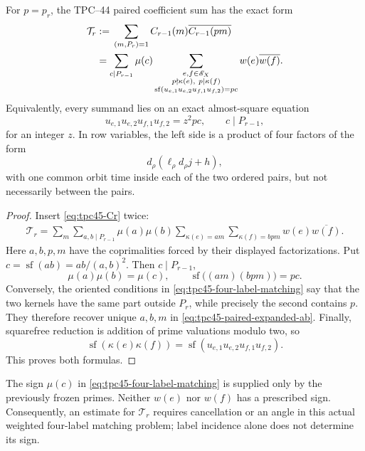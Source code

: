 \begin{proposition}
\label{prop:tpc45-four-label-matching}
For \(p=p_r\), the TPC--44 paired coefficient sum has the exact form
\begin{align}
 \mathcal T_r
 &:={}
 \sum_{(m,P_r)=1}C_{r-1}(m)\overline{C_{r-1}(pm)}
 \notag\\
 &=
 \sum_{c\mid P_{r-1}}\mu(c)
 \sum_{\substack{e,f\in\mathscr E_X\\
                  p\nmid\kappa(e),\ p\mid\kappa(f)\\
                  \operatorname{sf}(u_{e,1}u_{e,2}u_{f,1}u_{f,2})=pc}}
 w(e)\overline{w(f)}.
 \label{eq:tpc45-four-label-matching}
\end{align}
Equivalently, every summand lies on an exact almost-square equation
\begin{equation}
 u_{e,1}u_{e,2}u_{f,1}u_{f,2}=z^2pc,
 \qquad c\mid P_{r-1},
 \label{eq:tpc45-four-label-almost-square}
\end{equation}
for an integer \(z\).  In row variables, the left side is a product of
four factors of the form
\begin{equation}
 d_\rho(\ell_\rho d_\rho j+h),
 \label{eq:tpc45-four-label-row-factor}
\end{equation}
with one common orbit time inside each of the two ordered pairs, but not
necessarily between the pairs.
\end{proposition}

\begin{proof}
Insert \eqref{eq:tpc45-Cr} twice:
\begin{align}
 \mathcal T_r
 =\sum_m\sum_{a,b\mid P_{r-1}}\mu(a)\mu(b)
 \sum_{\kappa(e)=am}\sum_{\kappa(f)=bpm}
 w(e)\overline{w(f)}.
 \label{eq:tpc45-paired-expanded-ab}
\end{align}
Here \(a,b,p,m\) have the coprimalities forced by their displayed
factorizations.  Put
\(c=\operatorname{sf}(ab)=ab/(a,b)^2\).  Then
\(c\mid P_{r-1}\),
\begin{equation}
 \mu(a)\mu(b)=\mu(c),
 \qquad
 \operatorname{sf}\bigl((am)(bpm)\bigr)=pc.
 \label{eq:tpc45-ab-to-c}
\end{equation}
Conversely, the oriented conditions in
\eqref{eq:tpc45-four-label-matching} say that the two kernels have the
same part outside \(P_r\), while precisely the second contains \(p\).
They therefore recover unique \(a,b,m\) in
\eqref{eq:tpc45-paired-expanded-ab}.  Finally, squarefree reduction is
addition of prime valuations modulo two, so
\begin{equation}
 \operatorname{sf}(\kappa(e)\kappa(f))
 =\operatorname{sf}(u_{e,1}u_{e,2}u_{f,1}u_{f,2}).
 \label{eq:tpc45-sf-associative}
\end{equation}
This proves both formulas.
\end{proof}

The sign \(\mu(c)\) in
\eqref{eq:tpc45-four-label-matching} is supplied only by the previously
frozen primes.  Neither \(w(e)\) nor \(w(f)\) has a prescribed sign.
Consequently, an estimate for \(\mathcal T_r\) requires cancellation or
an angle in this actual weighted four-label matching problem; label
incidence alone does not determine its sign.

